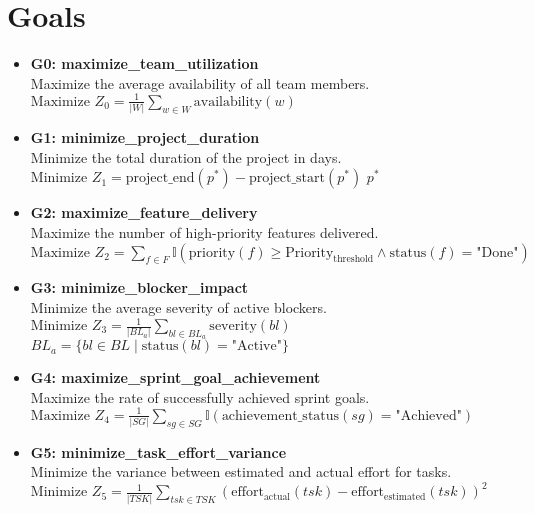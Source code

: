 \documentclass[11pt]{article}
\begin{document}
\section{Goals}
\begin{itemize}
    \item \textbf{G0: maximize\_team\_utilization} \\
          Maximize the average availability of all team members. \\
          $\text{Maximize } Z_0 = \frac{1}{|W|} \sum_{w \in W} \text{availability}(w)$

    \item \textbf{G1: minimize\_project\_duration} \\
          Minimize the total duration of the project in days. \\
          $\text{Minimize } Z_1 = \text{project\_end}(p^*) - \text{project\_start}(p^*)$ \quad {} $p^*$

    \item \textbf{G2: maximize\_feature\_delivery} \\
          Maximize the number of high-priority features delivered. \\
          $\text{Maximize } Z_2 = \sum_{f \in F} \mathbb{I}(\text{priority}(f) \geq \text{Priority}_{\text{threshold}} \wedge \text{status}(f) = \text{"Done"})$

    \item \textbf{G3: minimize\_blocker\_impact} \\
          Minimize the average severity of active blockers. \\
          $\text{Minimize } Z_3 = \frac{1}{|BL_a|} \sum_{bl \in BL_a} \text{severity}(bl)$ \quad {} $BL_a = \{bl \in BL \mid \text{status}(bl) = \text{"Active"}\}$

    \item \textbf{G4: maximize\_sprint\_goal\_achievement} \\
          Maximize the rate of successfully achieved sprint goals. \\
          $\text{Maximize } Z_4 = \frac{1}{|SG|} \sum_{sg \in SG} \mathbb{I}(\text{achievement\_status}(sg) = \text{"Achieved"})$

    \item \textbf{G5: minimize\_task\_effort\_variance} \\
          Minimize the variance between estimated and actual effort for tasks. \\
          $\text{Minimize } Z_5 = \frac{1}{|TSK|} \sum_{tsk \in TSK} (\text{effort}_{\text{actual}}(tsk) - \text{effort}_{\text{estimated}}(tsk))^2$


\end{itemize}
\end{document}

